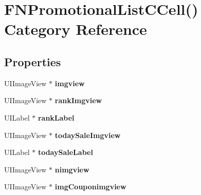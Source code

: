 \hypertarget{category_f_n_promotional_list_c_cell_07_08}{}\section{F\+N\+Promotional\+List\+C\+Cell() Category Reference}
\label{category_f_n_promotional_list_c_cell_07_08}
\subsection*{Properties}
\begin{DoxyCompactItemize}
\item 
\mbox{\label{category_f_n_promotional_list_c_cell_07_08_a64b5d4bf61e1f77953d4a51ba1d2948d}} 
U\+I\+Image\+View $\ast$ {\bfseries imgview}
\item 
\mbox{\label{category_f_n_promotional_list_c_cell_07_08_ad72d584d4f61a5d4a202d39fd16f12c3}} 
U\+I\+Image\+View $\ast$ {\bfseries rank\+Imgview}
\item 
\mbox{\label{category_f_n_promotional_list_c_cell_07_08_a6b5bb81d9dd48355a9ed58fe8db7ec7e}} 
U\+I\+Label $\ast$ {\bfseries rank\+Label}
\item 
\mbox{\label{category_f_n_promotional_list_c_cell_07_08_aa24bd0037706a298400a112261aace79}} 
U\+I\+Image\+View $\ast$ {\bfseries today\+Sale\+Imgview}
\item 
\mbox{\label{category_f_n_promotional_list_c_cell_07_08_a19cea033fda2dc65a3cfd28b0be6f7cf}} 
U\+I\+Label $\ast$ {\bfseries today\+Sale\+Label}
\item 
\mbox{\label{category_f_n_promotional_list_c_cell_07_08_a32b6dbaae4fbb7c5330a155f1825dbe7}} 
U\+I\+Image\+View $\ast$ {\bfseries nimgview}
\item 
\mbox{\label{category_f_n_promotional_list_c_cell_07_08_ad3e71f598ae9c88631eb0fadf02f529a}} 
U\+I\+Image\+View $\ast$ {\bfseries img\+Couponimgview}

\end{DoxyCompactItemize}
